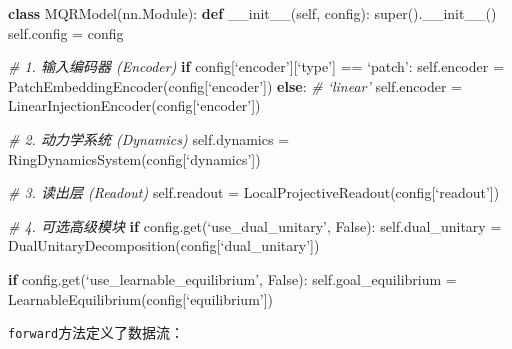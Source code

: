 \documentclass[
  12pt,
]{article}
\newenvironment{Shaded}{}{}
\newcommand{\BuiltInTok}[1]{#1}
\newcommand{\CommentTok}[1]{\textcolor[rgb]{0.38,0.63,0.69}{\textit{#1}}}
\newcommand{\ControlFlowTok}[1]{\textcolor[rgb]{0.00,0.44,0.13}{\textbf{#1}}}
\newcommand{\FunctionTok}[1]{\textcolor[rgb]{0.02,0.16,0.49}{#1}}
\newcommand{\KeywordTok}[1]{\textcolor[rgb]{0.00,0.44,0.13}{\textbf{#1}}}
\newcommand{\NormalTok}[1]{#1}
\newcommand{\OperatorTok}[1]{\textcolor[rgb]{0.40,0.40,0.40}{#1}}
\newcommand{\VariableTok}[1]{\textcolor[rgb]{0.10,0.09,0.49}{#1}}
\begin{document}
\begin{Shaded}
\begin{Highlighting}[]
\KeywordTok{class}\NormalTok{ MQRModel(nn.Module):}
    \KeywordTok{def} \FunctionTok{\_\_init\_\_}\NormalTok{(}\VariableTok{self}\NormalTok{, config):}
        \BuiltInTok{super}\NormalTok{().}\FunctionTok{\_\_init\_\_}\NormalTok{()}
        \VariableTok{self}\NormalTok{.config }\OperatorTok{=}\NormalTok{ config}
        
        \CommentTok{\# 1. 输入编码器 (Encoder)}
        \ControlFlowTok{if}\NormalTok{ config[‘encoder’][‘type’] }\OperatorTok{==}\NormalTok{ ‘patch’:}
            \VariableTok{self}\NormalTok{.encoder }\OperatorTok{=}\NormalTok{ PatchEmbeddingEncoder(config[‘encoder’])}
        \ControlFlowTok{else}\NormalTok{: }\CommentTok{\# ‘linear’}
            \VariableTok{self}\NormalTok{.encoder }\OperatorTok{=}\NormalTok{ LinearInjectionEncoder(config[‘encoder’])}
        
        \CommentTok{\# 2. 动力学系统 (Dynamics)}
        \VariableTok{self}\NormalTok{.dynamics }\OperatorTok{=}\NormalTok{ RingDynamicsSystem(config[‘dynamics’])}
        
        \CommentTok{\# 3. 读出层 (Readout)}
        \VariableTok{self}\NormalTok{.readout }\OperatorTok{=}\NormalTok{ LocalProjectiveReadout(config[‘readout’])}
        
        \CommentTok{\# 4. 可选高级模块}
        \ControlFlowTok{if}\NormalTok{ config.get(‘use\_dual\_unitary’, }\VariableTok{False}\NormalTok{):}
            \VariableTok{self}\NormalTok{.dual\_unitary }\OperatorTok{=}\NormalTok{ DualUnitaryDecomposition(config[‘dual\_unitary’])}
        
        \ControlFlowTok{if}\NormalTok{ config.get(‘use\_learnable\_equilibrium’, }\VariableTok{False}\NormalTok{):}
            \VariableTok{self}\NormalTok{.goal\_equilibrium }\OperatorTok{=}\NormalTok{ LearnableEquilibrium(config[‘equilibrium’])}
\end{Highlighting}
\end{Shaded}

\texttt{forward}方法定义了数据流：
\end{document}
